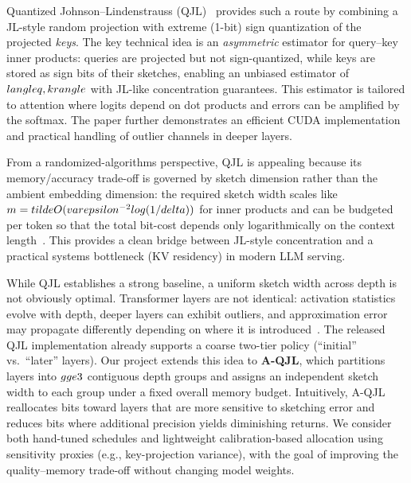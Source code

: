 \documentclass[conference]{IEEEtran}
\begin{document}
\noindent
Quantized Johnson--Lindenstrauss (QJL)~\cite{zandieh2024qjl} provides such a route by combining a JL-style random projection with extreme (1-bit) sign quantization of the projected \emph{keys}. The key technical idea is an \emph{asymmetric} estimator for query--key inner products: queries are projected but not sign-quantized, while keys are stored as sign bits of their sketches, enabling an unbiased estimator of $\\langle q,k\\rangle$ with JL-like concentration guarantees. This estimator is tailored to attention where logits depend on dot products and errors can be amplified by the softmax. The paper further demonstrates an efficient CUDA implementation and practical handling of outlier channels in deeper layers.

\noindent
From a randomized-algorithms perspective, QJL is appealing because its memory/accuracy trade-off is governed by sketch dimension rather than the ambient embedding dimension: the required sketch width scales like $m=\\tilde{O}(\\varepsilon^{-2}\\log(1/\\delta))$ for inner products and can be budgeted per token so that the total bit-cost depends only logarithmically on the context length~\cite{zandieh2024qjl}. This provides a clean bridge between JL-style concentration and a practical systems bottleneck (KV residency) in modern LLM serving.

\noindent
While QJL establishes a strong baseline, a uniform sketch width across depth is not obviously optimal. Transformer layers are not identical: activation statistics evolve with depth, deeper layers can exhibit outliers, and approximation error may propagate differently depending on where it is introduced~\cite{zandieh2024qjl}. The released QJL implementation already supports a coarse two-tier policy (``initial'' vs.\ ``later'' layers). Our project extends this idea to \textbf{A-QJL}, which partitions layers into $g\\ge 3$ contiguous depth groups and assigns an independent sketch width to each group under a fixed overall memory budget. Intuitively, A-QJL reallocates bits toward layers that are more sensitive to sketching error and reduces bits where additional precision yields diminishing returns. We consider both hand-tuned schedules and lightweight calibration-based allocation using sensitivity proxies (e.g., key-projection variance), with the goal of improving the quality--memory trade-off without changing model weights.
\end{document}
